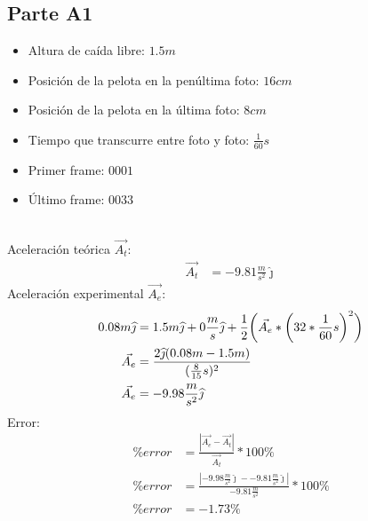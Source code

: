 \subsection{Parte A1}%
\label{sub:proce_parte_a1}

\begin{itemize}
	\item Altura de caída libre: $1.5m$
	\item Posición de la pelota en la penúltima foto: $16cm$
	\item Posición de la pelota en la última foto: $8cm$
	\item Tiempo que transcurre entre foto y foto: $ \frac{1}{60} s$
\end{itemize}
\hfill
\begin{itemize}
	\item Primer frame: $0001$
	\item Último frame: $0033$
\end{itemize}
\hfill\\
Aceleración teórica $\vec{A_t}$:
\begin{align*}
	\vec{A_t} &= -9.81 \frac{m}{s^2}\widehat{\jmath}
\end{align*}
Aceleración experimental $\vec{A_e}$:
\begin{align*}
	0.08m\widehat{\jmath} &= 1.5m\widehat{\jmath} + 0 \frac{m}{s}\widehat{\jmath} + \frac{1}{2}\bigg{(}\vec{A_e} * \bigg{(}32* \frac{1}{60} s\bigg{)}^2\bigg{)} \\
	\vec{A_e} &= \frac{2\widehat{\jmath}(0.08m - 1.5m)}{( \frac{8}{15}s)^2} \\
	\vec{A_e} &= -9.98 \frac{m}{s^2}\widehat{\jmath}
\end{align*}
Error:
\begin{align*}
	\% error &= \frac{|\vec{A_e} - \vec{A_t}|}{\vec{A_t}} * 100 \% \\
	\% error &= \frac{|-9.98 \frac{m}{s^2}\widehat{\jmath}--9.81 \frac{m}{s^2}\widehat{\jmath}|}{-9.81 \frac{m}{s^2}} * 100 \% \\
	\% error &= -1.73\%
\end{align*}
